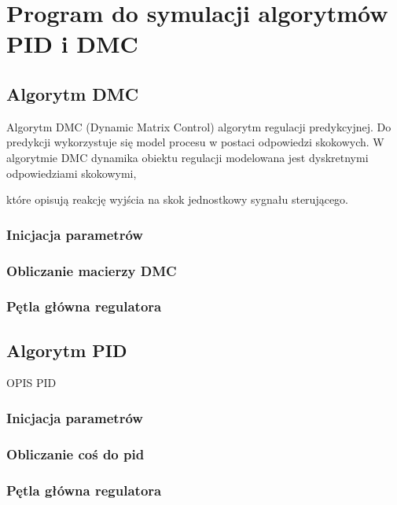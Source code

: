 \section{Program do symulacji algorytmów PID i DMC}
\label{projekt:zad3}

\subsection{Algorytm DMC}
\label{projekt:zad3:DMC:program}

Algorytm DMC (Dynamic Matrix Control) algorytm regulacji predykcyjnej. 
Do predykcji wykorzystuje się model procesu w postaci odpowiedzi skokowych. 
W algorytmie DMC dynamika obiektu regulacji modelowana jest dyskretnymi odpowiedziami skokowymi, 

które opisują reakcję wyjścia na skok jednostkowy sygnału sterującego.

\subsubsection{Inicjacja parametrów}
%
\newpage

\subsubsection{Obliczanie macierzy DMC}
%
\newpage


\subsubsection{Pętla główna regulatora}
%

\subsection{Algorytm PID}
\label{projekt:zad3:PID:program}

OPIS PID


\subsubsection{Inicjacja parametrów}
%
\newpage

\subsubsection{Obliczanie coś do pid}
%
\newpage


\subsubsection{Pętla główna regulatora}
%

\newpage

